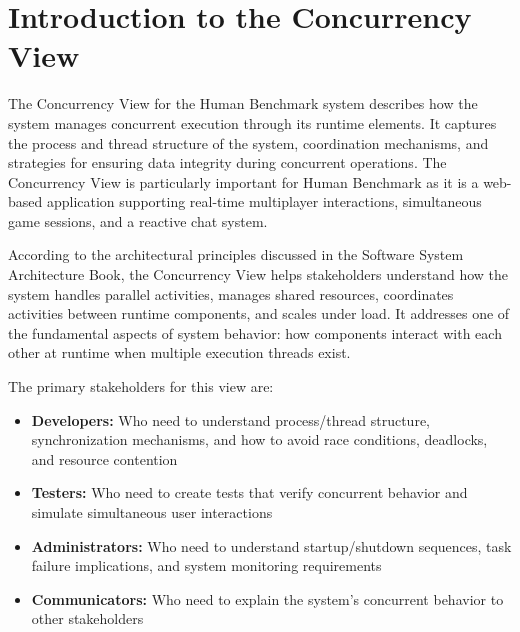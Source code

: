 

% 


\section{Introduction to the Concurrency View}

The Concurrency View for the Human Benchmark system describes how the system 
manages concurrent execution through its runtime elements. 
It captures the process and thread structure of the system, coordination mechanisms, 
and strategies for ensuring data integrity during concurrent operations. 
The Concurrency View is particularly important for Human Benchmark as it is a web-based 
application supporting real-time multiplayer interactions, simultaneous game sessions, 
and a reactive chat system.

According to the architectural principles discussed in the Software System Architecture Book, 
the Concurrency View helps stakeholders understand how the system handles parallel activities, 
manages shared resources, coordinates activities between runtime components, and scales under load. 
It addresses one of the fundamental aspects of system behavior: how components interact with each 
other at runtime when multiple execution threads exist.

The primary stakeholders for this view are:
\begin{itemize}
    \item \textbf{Developers:} Who need to understand process/thread structure, synchronization mechanisms, and how to avoid race conditions, deadlocks, and resource contention
    \item \textbf{Testers:} Who need to create tests that verify concurrent behavior and simulate simultaneous user interactions
    \item \textbf{Administrators:} Who need to understand startup/shutdown sequences, task failure implications, and system monitoring requirements
    \item \textbf{Communicators:} Who need to explain the system's concurrent behavior to other stakeholders
\end{itemize}

